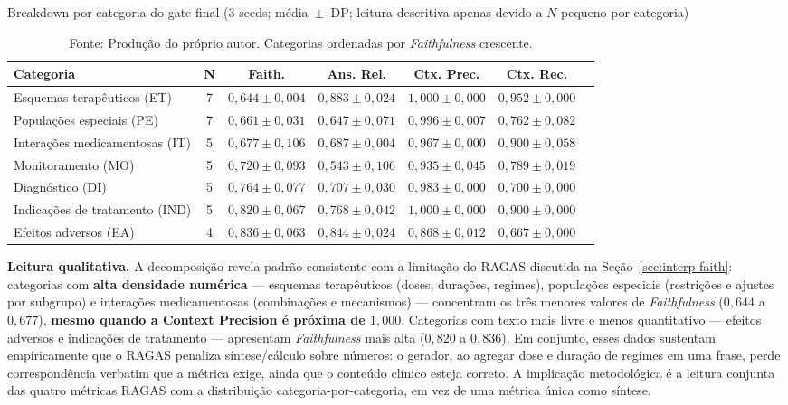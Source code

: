 \documentclass[
  12pt,
  oneside,
  a4paper,
  english,
  brazil
]{abntex2}
\begin{document}
\begin{apendicesenv}
\begin{table}[ht]
  \caption{Breakdown por categoria do gate final (3 seeds; média~$\pm$~DP;
           leitura descritiva apenas devido a $N$ pequeno por categoria)}
  \label{tab:per-category}
  \footnotesize
  \begin{tabularx}{\textwidth}{@{}Xcccccc@{}}
  \toprule
  \textbf{Categoria} & \textbf{N} &
  \textbf{Faith.} & \textbf{Ans. Rel.} & \textbf{Ctx. Prec.} & \textbf{Ctx. Rec.} \\
  \midrule
  Esquemas terapêuticos (ET)      & 7 & $0{,}644 \pm 0{,}004$ & $0{,}883 \pm 0{,}024$ & $1{,}000 \pm 0{,}000$ & $0{,}952 \pm 0{,}000$ \\
  Populações especiais (PE)       & 7 & $0{,}661 \pm 0{,}031$ & $0{,}647 \pm 0{,}071$ & $0{,}996 \pm 0{,}007$ & $0{,}762 \pm 0{,}082$ \\
  Interações medicamentosas (IT)  & 5 & $0{,}677 \pm 0{,}106$ & $0{,}687 \pm 0{,}004$ & $0{,}967 \pm 0{,}000$ & $0{,}900 \pm 0{,}058$ \\
  Monitoramento (MO)              & 5 & $0{,}720 \pm 0{,}093$ & $0{,}543 \pm 0{,}106$ & $0{,}935 \pm 0{,}045$ & $0{,}789 \pm 0{,}019$ \\
  Diagnóstico (DI)                & 5 & $0{,}764 \pm 0{,}077$ & $0{,}707 \pm 0{,}030$ & $0{,}983 \pm 0{,}000$ & $0{,}700 \pm 0{,}000$ \\
  Indicações de tratamento (IND)  & 5 & $0{,}820 \pm 0{,}067$ & $0{,}768 \pm 0{,}042$ & $1{,}000 \pm 0{,}000$ & $0{,}900 \pm 0{,}000$ \\
  Efeitos adversos (EA)           & 4 & $0{,}836 \pm 0{,}063$ & $0{,}844 \pm 0{,}024$ & $0{,}868 \pm 0{,}012$ & $0{,}667 \pm 0{,}000$ \\
  \bottomrule
  \end{tabularx}
  \caption*{Fonte: Produção do próprio autor. Categorias ordenadas por
            \textit{Faithfulness} crescente.}
\end{table}

\textbf{Leitura qualitativa.} A decomposição revela padrão consistente
com a limitação do RAGAS discutida na Seção~\ref{sec:interp-faith}:
categorias com \textbf{alta densidade numérica} --- esquemas
terapêuticos (doses, durações, regimes), populações especiais
(restrições e ajustes por subgrupo) e interações medicamentosas
(combinações e mecanismos) --- concentram os três menores valores de
\textit{Faithfulness} ($0{,}644$ a $0{,}677$), \textbf{mesmo quando a
Context Precision é próxima de $1{,}000$}. Categorias com texto mais
livre e menos quantitativo --- efeitos adversos e indicações de
tratamento --- apresentam \textit{Faithfulness} mais alta ($0{,}820$ a
$0{,}836$). Em conjunto, esses dados sustentam empiricamente que o
RAGAS penaliza síntese/cálculo sobre números: o gerador, ao agregar
dose e duração de regimes em uma frase, perde correspondência verbatim
que a métrica exige, ainda que o conteúdo clínico esteja correto. A
implicação metodológica é a leitura conjunta das quatro métricas
RAGAS com a distribuição categoria-por-categoria, em vez de uma
métrica única como síntese.


\end{apendicesenv}
\end{document}
